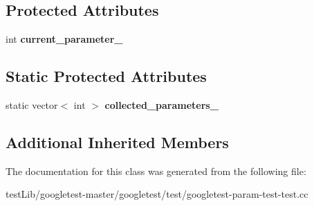 \subsection*{Protected Attributes}
\begin{DoxyCompactItemize}
\item 
\mbox{\label{classTestGenerationTest_a2d149b987b6dfe86ffbfae677199b0cd}} 
int {\bfseries current\+\_\+parameter\+\_\+}
\end{DoxyCompactItemize}
\subsection*{Static Protected Attributes}
\begin{DoxyCompactItemize}
\item 
\mbox{\label{classTestGenerationTest_a16dfa6f4b445c7e4a7a9611b34b7a7a2}} 
static vector$<$ int $>$ {\bfseries collected\+\_\+parameters\+\_\+}
\end{DoxyCompactItemize}
\subsection*{Additional Inherited Members}


The documentation for this class was generated from the following file\+:\begin{DoxyCompactItemize}
\item 
test\+Lib/googletest-\/master/googletest/test/googletest-\/param-\/test-\/test.\+cc\end{DoxyCompactItemize}
